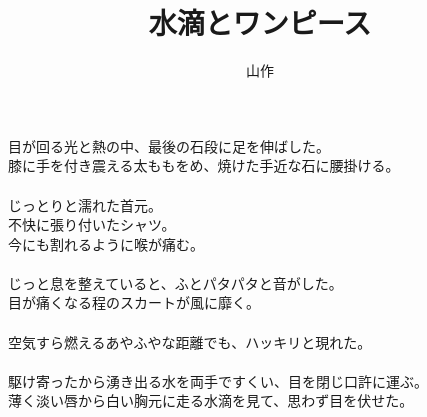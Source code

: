 \documentclass[a5j,12pt]{tbook}
\title{水滴とワンピース}
\author{\rensuji{J}山\rensuji{B}作}
\date{}
\begin{document}
\maketitle

目が回る光と熱の中、最後の石段に足を伸ばした。\\
膝に手を付き震える太ももをめ、焼けた手近な石に腰掛ける。 \\
\\
じっとりと濡れた首元。\\
不快に張り付いたシャツ。\\
今にも割れるように喉が痛む。\\
\\
じっと息を整えていると、ふとパタパタと音がした。\\
目が痛くなる程のスカートが風に靡く。\\
\\
空気すら燃えるあやふやな距離でも、ハッキリと現れた。\\
\\
駆け寄ったから湧き出る水を両手ですくい、目を閉じ口許に運ぶ。\\
薄く淡い唇から白い胸元に走る水滴を見て、思わず目を伏せた。
\end{document}
